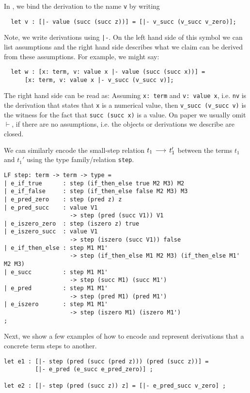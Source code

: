 In \beluga, we bind the derivation to the name \lstinline!v! by writing 
\begin{lstlisting}
  let v : [|- value (succ (succ z))] = [|- v_succ (v_succ v_zero)];
\end{lstlisting}  
Note,  we write derivations using \lstinline!|-!.  On the left hand
side  of this symbol  we can list assumptions and the right hand side
describes  what we claim can be derived from these assumptions.  For example, we might say:

\begin{lstlisting}
  let w : [x: term, v: value x |- value (succ (succ x))] =
      [x: term, v: value x |- v_succ (v_succ v)];
\end{lstlisting}

The  right  hand  side   can  be  read  as:   Assuming  \lstinline!x: term!  and
\lstinline!v: value x!,  i.e. \lstinline!nv!  is the derivation that states
that \lstinline!x! is  a numerical value,  then \lstinline!v_succ (v_succ v)!
is the witness for the fact that \lstinline!succ (succ x)! is a
value. On paper we usually omit $\vdash$, if there are no assumptions,
i.e. the objects or derivations we describe are closed.


We can similarly  encode the small-step relation  $t_1 \mathrel{\,\longrightarrow\,} t_1'$  between the
terms $t_1$ and $t_1'$ using the type family/relation \lstinline!step!.

\begin{lstlisting}
LF step: term -> term -> type =
| e_if_true      : step (if_then_else true M2 M3) M2
| e_if_false     : step (if_then_else false M2 M3) M3
| e_pred_zero    : step (pred z) z
| e_pred_succ    : value V1
                   -> step (pred (succ V1)) V1
| e_iszero_zero  : step (iszero z) true
| e_iszero_succ  : value V1
                   -> step (iszero (succ V1)) false
| e_if_then_else : step M1 M1'
                   -> step (if_then_else M1 M2 M3) (if_then_else M1' M2 M3)
| e_succ         : step M1 M1'
                   -> step (succ M1) (succ M1')
| e_pred         : step M1 M1'
                   -> step (pred M1) (pred M1')
| e_iszero       : step M1 M1'
                   -> step (iszero M1) (iszero M1')
;
\end{lstlisting}

Next,  we show a few examples of  how to encode and represent derivations that a
concrete term steps to another.

\begin{lstlisting}
let e1 : [|- step (pred (succ (pred z))) (pred (succ z))] =
         [|- e_pred (e_succ e_pred_zero)] ;

let e2 : [|- step (pred (succ z)) z] = [|- e_pred_succ v_zero] ;
\end{lstlisting}

